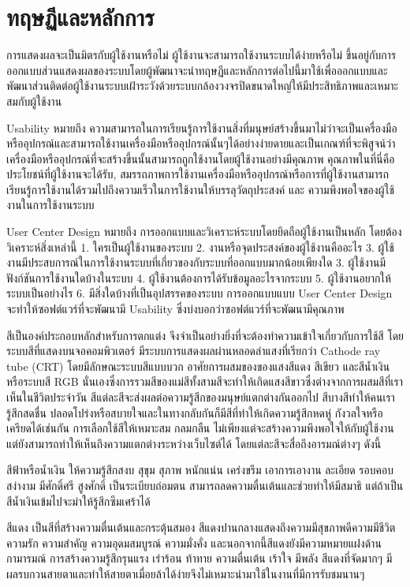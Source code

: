 \section{ทฤษฏีและหลักการ}
		
		การแสดงผลจะเป็นมิตรกับผู้ใช้งานหรือไม่ ผู้ใช้งานจะสามารถใช้งานระบบได้ง่ายหรือไม่  ขึ้นอยู่กับการออกแบบส่วนแสดงผลของระบบโดยผู้พัฒนาจะนำทฤษฏีและหลักการต่อไปนี้มาใช้เพื่อออกแบบและพัฒนาส่วนติดต่อผู้ใช้งานระบบเฝ้าระวังด้วยระบบกล้องวงจรปิดขนาดใหญ่ให้มีประสิทธิภาพและเหมาะสมกับผู้ใช้งาน

		Usability หมายถึง ความสามารถในการเรียนรู้การใช้งานสิ่งที่มนุษย์สร้างขึ้นมาไม่ว่าจะเป็นเครื่องมือหรืออุปกรณ์และสามารถใช้งานเครื่องมือหรืออุปกรณ์นั้นๆได้อย่างง่ายดายและเป็นเกณฑ์ที่จะพิสูจน์ว่าเครื่องมือหรืออุปกรณ์ที่จะสร้างขึ้นนั้นสามารถถูกใช้งานโดยผู้ใช้งานอย่างมีคุณภาพ คุณภาพในที่นี่คือ ประโยชน์ที่ผู้ใช้งานจะได้รับ, สมรรถภาพการใช้งานเครื่องมือหรืออุปกรณ์หรือการที่ผู้ใช้งานสามารถเรียนรู้การใช้งานได้รวมไปถึงความเร็วในการใช้งานให้บรรลุวัตถุประสงค์ และ ความพึงพอใจของผู้ใช้งานในการใช้งานระบบ
	

		User Center Design หมายถึง การออกแบบและวิเคราะห์ระบบโดยยึดถือผู้ใช้งานเป็นหลัก โดยต้องวิเคราะห์สิ่งเหล่านี้
1. ใครเป็นผู้ใช้งานของระบบ
2. งานหรือจุดประสงค์ของผู้ใช้งานคืออะไร
3. ผู้ใช้งานมีประสบการณ์ในการใช้งานระบบที่เกี่ยวของกับระบบที่ออกแบบมากน้อยเพียงใด
3. ผู้ใช้งานมีฟังก์ชันการใช้งานใดบ้างในระบบ
4. ผู้ใช้งานต้องการได้รับข้อมูลอะไรจากระบบ
5. ผู้ใช้งานอยากให้ระบบเป็นอย่างไร
6. มีสิ่งใดบ้างที่เป็นอุปสรรคของระบบ
	การออกแบบแบบ User Center Design จะทำให้ซอฟต์แวร์ที่จะพัฒนามี Usability ซึ่งบ่งบอกว่าซอฟต์แวร์ที่จะพัฒนามีคุณภาพ


		สีเป็นองค์ประกอบหลักสำหรับการตกแต่ง จึงจำเป็นอย่างยิ่งที่จะต้องทำความเข้าใจเกี่ยวกับการใช้สี โดยระบบสีที่แสดงบนจอคอมพิวเตอร์ มีระบบการแสดงผลผ่านหลอดลำแสงที่เรียกว่า Cathode ray tube (CRT) โดยมีลักษณะระบบสีแบบบวก อาศัยการผสมของของแสงสีแดง สีเขียว และสีน้ำเงิน หรือระบบสี RGB นั่นเองซึ่งการรวมสีของแม่สีทั้งสามสีจะทำให้เกิดแสงสีขาวซึ่งต่างจากการผสมสีที่เราเห็นในชีวิตประจำวัน สีแต่ละสีจะส่งผลต่อความรู้สึกของมนุษย์แตกต่างกันออกไป สีบางสีทำให้คนเรารู้สึกสดชื่น ปลอดโปร่งหรือสบายใจและในทางกลับกันก็มีสีที่ทำให้เกิดความรู้สึกหดหู่ กังวลใจหรือเครียดได้เช่นกัน การเลือกใช้สีให้เหมาะสม กลมกลืน ไม่เพียงแต่จะสร้างความพึงพอใจให้กับผู้ใช้งาน แต่ยังสามารถทำให้เห็นถึงความแตกต่างระหว่างเว็บไซต์ได้ โดยแต่ละสีจะสื่อถึงอารมณ์ต่างๆ ดังนี้

		สีฟ้าหรือน้ำเงิน ให้ความรู้สึกสงบ สุขุม สุภาพ หนักแน่น เคร่งขรึม เอาการเอางาน ละเอียด รอบคอบ สง่างาม มีศักดิ์ศรี สูงศักดิ์ เป็นระเบียบถ่อมตน สามารถลดความตื่นเต้นและช่วยทำให้มีสมาธิ แต่ถ้าเป็นสีน้ำเงินเข้มไปจะมำให้รู้สึกซึมเศร้าได้

		สีแดง เป็นสีที่สร้างความตื่นเต้นและกระตุ้นสมอง สีแดงปานกลางแสดงถึงความมีสุขภาพดีความมีชีวิต ความรัก ความสำคัญ ความอุดมสมบูรณ์ ความมั่งคั่ง และนอกจากนี้สีแดงยังมีความหมายแฝงด้านกามารมณ์ การสร้างความรู้สึกรุนแรง เร่าร้อน ท้าทาย ความตื่นเต้น เร้าใจ มีพลัง สีแดงที่จัดมากๆ มีผลรบกวนสายตาและทำให้สายตาเมื่อยล้าได้ง่ายจึงไม่เหมาะนำมาใช้ในงานที่มีการรับชมนานๆ
	